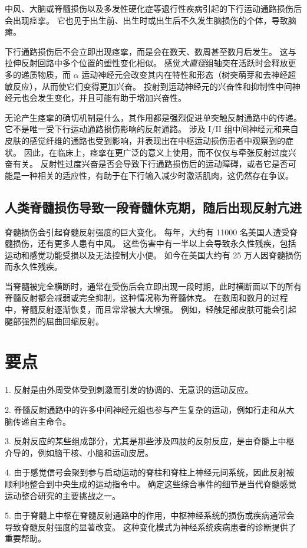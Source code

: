 中风、大脑或脊髓损伤以及多发性硬化症等退行性疾病引起的下行运动通路损伤后会出现痉挛。
它也见于出生前、出生时或出生后不久发生脑损伤的个体，导致脑瘫。


下行通路损伤后不会立即出现痉挛，而是会在数天、数周甚至数月后发生。
这与拉伸反射回路中多个位置的塑性变化相似。
感觉\textit{大直径}组轴突在活跃时会释放更多的递质物质，而 $ \alpha $ 运动神经元会改变其内在特性和形态（树突萌芽和去神经超敏反应），从而使它们变得更加兴奋。
投射到运动神经元的兴奋性和抑制性中间神经元也会发生变化，并且可能有助于增加兴奋性。


无论产生痉挛的确切机制是什么，其作用都是强烈促进单突触反射通路中的传递。
它不是唯一受下行运动通路损伤影响的反射通路。
涉及 I/II 组中间神经元和来自皮肤的感觉纤维的通路也受到影响，并表现出在中枢运动损伤患者中观察到的症状。
因此，在临床上，痉挛在更广泛的意义上使用，而不仅仅与牵张反射过度兴奋有关。
反射性过度兴奋是否会导致下行通路损伤后的运动障碍，或者它是否可能是一种相关的适应性，有助于在下行输入减少时激活肌肉，这仍然存在争议。



\subsection{人类脊髓损伤导致一段脊髓休克期，随后出现反射亢进}

脊髓损伤会引起脊髓反射强度的巨大变化。
每年，大约有 11000 名美国人遭受脊髓损伤，还有更多人患有中风。
这些伤害中有一半以上会导致永久性残疾，包括运动和感觉功能受损以及无法控制大小便。
如今在美国大约有 25 万人因脊髓损伤而永久性残疾。


当脊髓被完全横断时，通常在受伤后会立即出现一段时期，此时横断面以下的所有脊髓反射都会减弱或完全抑制，这种情况称为脊髓休克。
在数周和数月的过程中，脊髓反射逐渐恢复，而且常常被大大增强。
例如，轻触足部皮肤可能会引起腿部强烈的屈曲回缩反射。



\section{要点}

1. 反射是由外周受体受到刺激而引发的协调的、无意识的运动反应。


2. 脊髓反射通路中的许多中间神经元组也参与产生复杂的运动，例如行走和从大脑传递自主命令。


3. 反射反应的某些组成部分，尤其是那些涉及四肢的反射反应，是由脊髓上中枢介导的，例如脑干核、小脑和运动皮层。


4. 由于感觉信号会聚到参与启动运动的脊柱和脊柱上神经元间系统，因此反射被顺利地整合到中央生成的运动指令中。
确定这些综合事件的细节是当代脊髓感觉运动整合研究的主要挑战之一。


5. 由于脊髓上中枢在脊髓反射通路中的作用，中枢神经系统的损伤或疾病通常会导致脊髓反射强度的显著改变。
这种变化模式为神经系统疾病患者的诊断提供了重要帮助。
